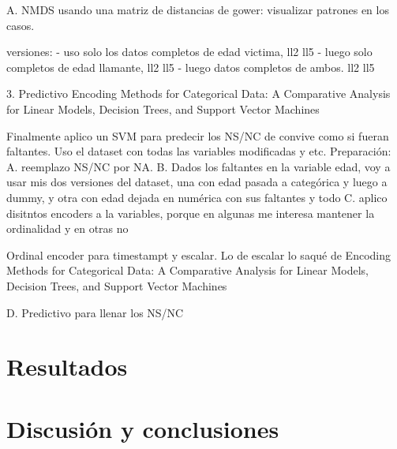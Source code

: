 \documentclass[10pt, spanish]{article}
\begin{document}
A. NMDS usando una matriz de distancias de gower: visualizar patrones en los casos. 

versiones:  
- uso solo los datos completos de edad victima, ll2 ll5
- luego solo completos de edad llamante, ll2 ll5
- luego datos completos de ambos. ll2 ll5



3. Predictivo
Encoding Methods for Categorical Data: A Comparative Analysis for Linear Models, Decision Trees, and Support Vector Machines

Finalmente aplico un SVM para predecir los NS/NC de convive como si fueran faltantes.
Uso el dataset con todas las variables modificadas y etc.
Preparación: 
A. reemplazo NS/NC por NA.
B. Dados los faltantes en la variable edad, voy a usar mis dos versiones del dataset, una con
edad pasada a categórica y luego a dummy, y otra con edad dejada en numérica con sus faltantes y todo
C. aplico disitntos encoders a la variables, porque en algunas me interesa mantener la ordinalidad y en otras no


Ordinal encoder para timestampt y escalar. Lo de escalar lo saqué de Encoding Methods for Categorical Data: A Comparative Analysis for Linear Models, Decision Trees, and Support Vector Machines


D. Predictivo para llenar los NS/NC  

\section{Resultados}\label{res}

\section{Discusión y conclusiones}\label{conc}















\newpage


\end{document}
